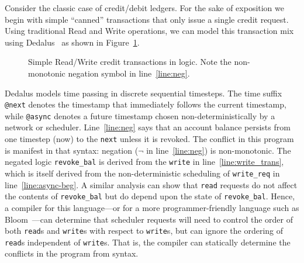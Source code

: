 \documentclass{sig-alternate}
\newcommand{\paa}[1]{{\textcolor{blue}{[[#1 -- paa]]}}}
\begin{document}
Consider the classic case of credit/debit ledgers. For the sake of exposition we begin with simple ``canned'' transactions that only issue a single credit request.  Using
traditional Read and Write operations, we can model this transaction mix using Dedalus~\cite{dedalus} as
shown in Figure~\ref{fig:balance}.

\begin{figure}[ht]
\begin{scriptsize}

\centering
\vspace{-10pt}
\caption{Simple Read/Write credit transactions in logic.  Note the non-monotonic negation symbol in line~\ref{line:neg}.}
\label{fig:balance}
\end{scriptsize}
\vspace{-2pt}
\end{figure}

Dedalus models time passing in discrete sequential timesteps.
The time suffix \texttt{@next} denotes the timestamp that immediately follows the
current timestamp, while \texttt{@async} denotes a 
future timestamp chosen non-deterministically by a network or scheduler.  
Line~\ref{line:neg} says that an account balance persists from one timestep (now) to the \texttt{next} unless it is revoked. The
conflict in this program is manifest in that syntax: negation
($\neg$ in line~\ref{line:neg}) is non-monotonic.  
The negated logic \texttt{revoke\_bal} is derived from the \texttt{write} in line~\ref{line:write_trans}, 
which is itself derived from the non-deterministic scheduling of \texttt{write\_req} 
in line~\ref{line:async-beg}.  A similar analysis can show that \texttt{read} requests do not affect the contents of \texttt{revoke\_bal} but do depend upon the state of \texttt{revoke\_bal}.
Hence, a compiler for this language---or for a more programmer-friendly language
such as Bloom~\cite{Alvaro2011}---can determine that scheduler requests will need to control the order of both \texttt{read}s and \texttt{write}s with respect to \texttt{write}s, but can ignore the ordering of \texttt{read}s independent of \texttt{write}s.  That is, the compiler can statically determine the conflicts in the program from syntax.
\end{document}
